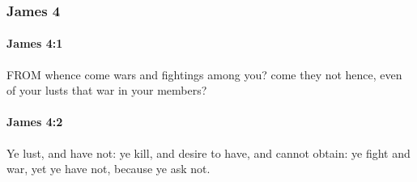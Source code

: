 	\subsubsection{James 4} %
		\label{JAMES-4}
		
		\paragraph{James 4:1} %
			\label{JAMES-4-1}

			FROM whence come wars and fightings among you? come they not hence, even of your lusts that war in your members?

			\begin{framed}
			\scriptsize
				\begin{compactdesc}
					\item[SBLG] 
				\end{compactdesc}
			\end{framed}

		\paragraph{James 4:2} %
			\label{JAMES-4-2}

			Ye lust, and have not: ye kill, and desire to have, and cannot obtain: ye fight and war, yet ye have not, because ye ask not.

